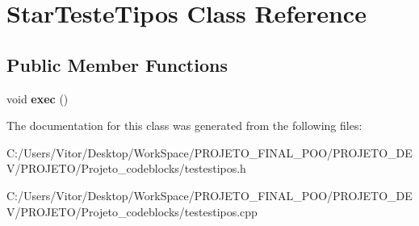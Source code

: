\hypertarget{class_star_teste_tipos}{\section{Star\-Teste\-Tipos Class Reference}
\label{class_star_teste_tipos}
}
\subsection*{Public Member Functions}
\begin{DoxyCompactItemize}
\item 
\hypertarget{class_star_teste_tipos_a825f1ad37f2577ba65f14a627bfd682c}{void {\bfseries exec} ()}\label{class_star_teste_tipos_a825f1ad37f2577ba65f14a627bfd682c}

\end{DoxyCompactItemize}


The documentation for this class was generated from the following files\-:\begin{DoxyCompactItemize}
\item 
C\-:/\-Users/\-Vitor/\-Desktop/\-Work\-Space/\-P\-R\-O\-J\-E\-T\-O\-\_\-\-F\-I\-N\-A\-L\-\_\-\-P\-O\-O/\-P\-R\-O\-J\-E\-T\-O\-\_\-\-D\-E\-V/\-P\-R\-O\-J\-E\-T\-O/\-Projeto\-\_\-codeblocks/testestipos.\-h\item 
C\-:/\-Users/\-Vitor/\-Desktop/\-Work\-Space/\-P\-R\-O\-J\-E\-T\-O\-\_\-\-F\-I\-N\-A\-L\-\_\-\-P\-O\-O/\-P\-R\-O\-J\-E\-T\-O\-\_\-\-D\-E\-V/\-P\-R\-O\-J\-E\-T\-O/\-Projeto\-\_\-codeblocks/testestipos.\-cpp\end{DoxyCompactItemize}

